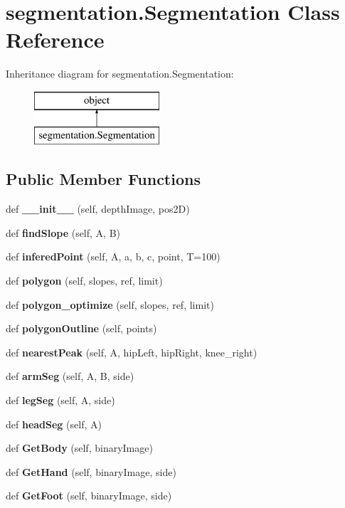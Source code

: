 \section{segmentation.\+Segmentation Class Reference}
\label{classsegmentation_1_1_segmentation}
Inheritance diagram for segmentation.\+Segmentation\+:\begin{figure}[H]
\begin{center}
\leavevmode
\includegraphics[height=2.000000cm]{classsegmentation_1_1_segmentation}
\end{center}
\end{figure}
\subsection*{Public Member Functions}
\begin{DoxyCompactItemize}
\item 
def \textbf{ \+\_\+\+\_\+init\+\_\+\+\_\+} (self, depth\+Image, pos2D)
\item 
def \textbf{ find\+Slope} (self, A, B)
\item 
def \textbf{ infered\+Point} (self, A, a, b, c, point, T=100)
\item 
def \textbf{ polygon} (self, slopes, ref, limit)
\item 
def \textbf{ polygon\+\_\+optimize} (self, slopes, ref, limit)
\item 
def \textbf{ polygon\+Outline} (self, points)
\item 
def \textbf{ nearest\+Peak} (self, A, hip\+Left, hip\+Right, knee\+\_\+right)
\item 
def \textbf{ arm\+Seg} (self, A, B, side)
\item 
def \textbf{ leg\+Seg} (self, A, side)
\item 
def \textbf{ head\+Seg} (self, A)
\item 
def \textbf{ Get\+Body} (self, binary\+Image)
\item 
def \textbf{ Get\+Hand} (self, binary\+Image, side)
\item 
def \textbf{ Get\+Foot} (self, binary\+Image, side)
\end{DoxyCompactItemize}
